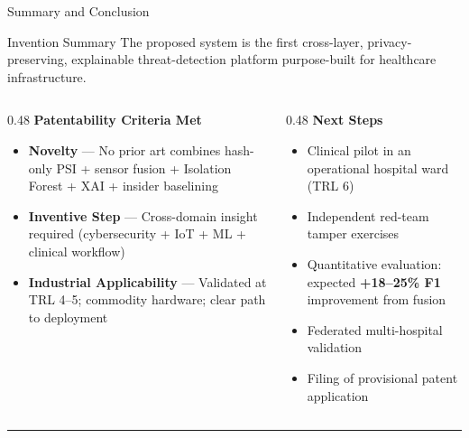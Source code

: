\documentclass[10pt, aspectratio=169]{beamer}
\begin{document}
\begin{frame}{Summary and Conclusion}
  \begin{block}{Invention Summary}
    The proposed system is the first cross-layer, privacy-preserving,
    explainable threat-detection platform purpose-built for healthcare infrastructure.
  \end{block}
  \vspace{6pt}
  \begin{columns}[T]
    \begin{column}{0.48\textwidth}
      \textbf{\textcolor{patentblue}{Patentability Criteria Met}}
      \begin{itemize}\small
        \item[\checkmark] \textbf{Novelty} — No prior art combines hash-only PSI + sensor fusion + Isolation Forest + XAI + insider baselining
        \item[\checkmark] \textbf{Inventive Step} — Cross-domain insight required (cybersecurity + IoT + ML + clinical workflow)
        \item[\checkmark] \textbf{Industrial Applicability} — Validated at TRL 4--5; commodity hardware; clear path to deployment
      \end{itemize}
    \end{column}
    \begin{column}{0.48\textwidth}
      \textbf{\textcolor{patentblue}{Next Steps}}
      \begin{itemize}\small
        \item Clinical pilot in an operational hospital ward (TRL 6)
        \item Independent red-team tamper exercises
        \item Quantitative evaluation: expected \textbf{+18--25\% F1} improvement from fusion
        \item Federated multi-hospital validation
        \item Filing of provisional patent application
      \end{itemize}
    \end{column}
  \end{columns}
  \vspace{10pt}
  \begin{center}
    \textcolor{accentgold}{\rule{0.4\textwidth}{1pt}}
  \end{center}
\end{frame}
\end{document}
